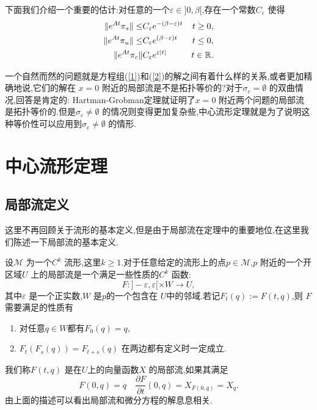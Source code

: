 下面我们介绍一个重要的估计:对任意的一个$\varepsilon \in ]0,\beta[$,存在一个常数$C_\varepsilon $ 使得
\begin{equation}
  \begin{aligned}
    \|e^{At}\pi_s\|\le & C_\varepsilon  e^{-(\beta-\varepsilon )t} & t\ge 0,\\
    \|e^{At}\pi_u\|\le & C_\varepsilon  e^{(\beta-\varepsilon )t} & t\le 0,\\
    \|e^{At}\pi_c\| & C_\varepsilon  e^{\varepsilon \left| t \right| } & t \in \mathbb{R}.
  \end{aligned}\label{asym}
\end{equation}

一个自然而然的问题就是方程组(\ref{1})和(\ref{2})的解之间有着什么样的关系,或者更加精确地说,它们的解在 $x=0$ 附近的局部流是不是拓扑等价的?对于$\sigma_c=\emptyset$ 的双曲情况,回答是肯定的: Hartman-Grobman定理\cite{chow2012methods}就证明了$x=0$ 附近两个问题的局部流是拓扑等价的.但是$\sigma_c\neq\emptyset$ 的情况则变得更加复杂些,中心流形定理就是为了说明这种等价性可以应用到$\sigma_c\neq\emptyset$ 的情形.

\section{中心流形定理}
\subsection{局部流定义}
这里不再回顾关于流形的基本定义,但是由于局部流在定理中的重要地位,在这里我们陈述一下局部流的基本定义\cite{loring2008introduction}.
\begin{definition}
设$\mathcal{M}$ 为一个$C^{k}$ 流形,这里$k\ge 1$.对于任意给定的流形上的点$p \in \mathcal{M}$,$p$ 附近的一个开区域$U$ 上的局部流是一个满足一些性质的$C^{k}$ 函数:
\begin{equation}
  F:]-\varepsilon ,\varepsilon [\times W\to U,
\end{equation}
其中$\varepsilon $ 是一个正实数,$W$ 是$p$的一个包含在 $U$中的邻域.若记$F_t(q):=F(t,q)$,则 $F$需要满足的性质有
\begin{enumerate}
  \item 对任意$q\in W$都有$F_0(q)=q$,
  \item $F_t(F_s(q))=F_{t+s}(q)$ 在两边都有定义时一定成立.
\end{enumerate}
\end{definition}
我们称$F(t,q)$ 是在$U$上的向量函数$X$ 的局部流,如果其满足
\begin{equation}
  F(0,q)=q \quad \frac{\partial F}{\partial t}(0,q)=X_{F(0,q)}=X_q.
\end{equation}
由上面的描述可以看出局部流和微分方程的解息息相关.
